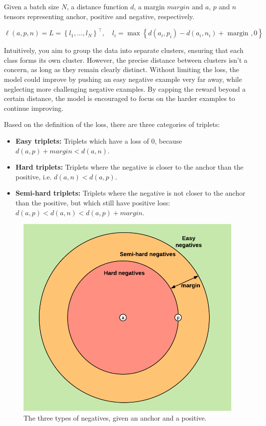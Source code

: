 Given a batch size $N$, a distance function $d$, a margin $margin$ and $a$, $p$ and $n$ tensors representing anchor, positive and negative, respectively.

$\ell(a, p, n)=L=\left\{l_1, \ldots, l_N\right\}^{\top}, \quad l_i=\max \left\{d\left(a_i, p_i\right)-d\left(a_i, n_i\right)+\text { margin }, 0\right\}$


Intuitively, you aim to group the data into separate clusters, ensuring that each class forms its own cluster. However, the precise distance between clusters isn't a concern, as long as they remain clearly distinct. Without limiting the loss, the model could improve by pushing an easy negative example very far away, while neglecting more challenging negative examples. By capping the reward beyond a certain distance, the model is encouraged to focus on the harder examples to continue improving.

Based on the definition of the loss, there are three categories of triplets:
\begin{itemize}
  \item \textbf{Easy triplets:} Triplets which have a loss of $0$, because $d(a, p) + margin < d(a, n)$.
  \item \textbf{Hard triplets:} Triplets where the negative is closer to the anchor than the positive, i.e. $d(a, n) < d(a, p)$.
  \item \textbf{Semi-hard triplets:} Triplets where the negative is not closer to the anchor than the positive, but which still have positive loss: $d(a, p) < d(a, n) < d(a, p) + margin$.
\end{itemize}

\begin{figure}[]
  \centering
  \includegraphics[width=0.5\columnwidth]{images/negative_types.png}
  \caption{The three types of negatives, given an anchor and a positive.}
  \label{fig:negative_types}
\end{figure}

